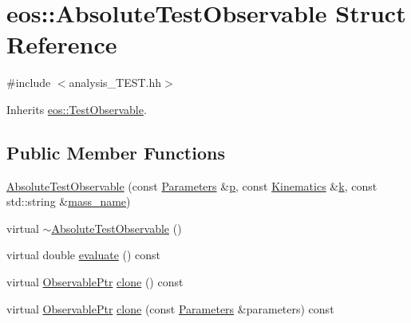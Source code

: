 \hypertarget{structeos_1_1AbsoluteTestObservable}{
\section{eos::AbsoluteTestObservable Struct Reference}
\label{structeos_1_1AbsoluteTestObservable}
}


{\ttfamily \#include $<$analysis\_\-TEST.hh$>$}

Inherits \hyperlink{structeos_1_1TestObservable}{eos::TestObservable}.\subsection*{Public Member Functions}
\begin{DoxyCompactItemize}
\item 
\hyperlink{structeos_1_1AbsoluteTestObservable_a0e044df3b5ec549d51547e8b9f8af55b}{AbsoluteTestObservable} (const \hyperlink{classeos_1_1Parameters}{Parameters} \&\hyperlink{structeos_1_1TestObservable_ab06f6f24a04051ec2a8ebaa5d78ee953}{p}, const \hyperlink{classeos_1_1Kinematics}{Kinematics} \&\hyperlink{structeos_1_1TestObservable_a58ef1eee27197c2bce21b2e576411a74}{k}, const std::string \&\hyperlink{structeos_1_1TestObservable_afa242c890fb7299876f30e8d01e218fc}{mass\_\-name})
\item 
virtual \hyperlink{structeos_1_1AbsoluteTestObservable_ad2fa287cd756cd2d2e639ef39106debe}{$\sim$AbsoluteTestObservable} ()
\item 
virtual double \hyperlink{structeos_1_1AbsoluteTestObservable_a47742fbfae1d0d8b57c09ee2a7501376}{evaluate} () const 
\item 
virtual \hyperlink{namespaceeos_a470e5dd806bd129080f1aa0c2954646f}{ObservablePtr} \hyperlink{structeos_1_1AbsoluteTestObservable_ac509cca6dca7383653b2d0e5c387db07}{clone} () const 
\item 
virtual \hyperlink{namespaceeos_a470e5dd806bd129080f1aa0c2954646f}{ObservablePtr} \hyperlink{structeos_1_1AbsoluteTestObservable_af0a14d774c083598130b3062f956c4c9}{clone} (const \hyperlink{classeos_1_1Parameters}{Parameters} \&parameters) const 
\end{DoxyCompactItemize}


